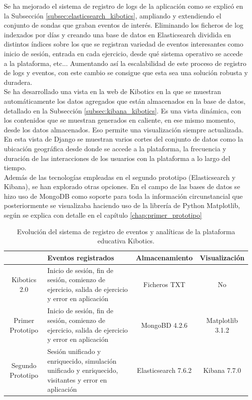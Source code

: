 \documentclass[a4paper, 12pt]{book}
\begin{document}
		Se ha mejorado el sistema de registro de logs de la aplicación como se explicó en la Subsección \ref{subsec:elasticsearch_kibotics}, ampliando y extendiendo el conjunto de sondas que graban eventos de interés. Eliminando los ficheros de log indexados por días y creando una base de datos en Elasticsearch dividida en distintos índices sobre los que se registran variedad de eventos interesantes como inicio de sesión, entrada en cada ejercicio, desde qué sistema operativo se accede a la plataforma, etc... Aumentando así la escalabilidad de este proceso de registro de logs y eventos, con este cambio se consigue que esta sea una solución robusta y duradera.\\
	
		Se ha desarrollado una vista en la web de Kibotics en la que se muestran automáticamente los datos agregados que están almacenados en la base de datos, detallado en la Subsección \ref{subsec:kibana_kibotics}. Es una vista dinámica, con los contenidos que se muestran generados en caliente, en ese mismo momento, desde los datos almacenados. Eso permite una visualización siempre actualizada. En esta vista de Django se muestran varios cortes del conjunto de datos como la ubicación geográfica desde donde se accede a la plataforma, la frecuencia y duración de las interacciones de los usuarios con la plataforma a lo largo del tiempo. \\
	
		Además de las tecnologías empleadas en el segundo prototipo (Elasticsearch y Kibana), se han explorado otras opciones. En el campo de las bases de datos se hizo uso de MongoDB como soporte para toda la información circunstancial que posteriormente se visualizaba haciendo uso de la librería de Python Matplotlib, según se explica con detalle en el capítulo \ref{chap:primer_prototipo} \\

		
		\begin{table}[H]
			\begin{center}
				\begin{tabular}{ | c | p{6cm} | c | c |} 
					\hline
				 & Eventos registrados & Almacenamiento & Visualización \\ 
					\hline 
					Kibotics 2.0 & Inicio de sesión, fin de sesión, comienzo de ejercicio, salida de ejercicio y error en aplicación & Ficheros TXT & No\\ 
					\hline
					Primer Prototipo & Inicio de sesión, fin de sesión, comienzo de ejercicio, salida de ejercicio y error en aplicación& MongoBD 4.2.6 & Matplotlib 3.1.2\\ 
					\hline
					Segundo Prototipo & Sesión unificado y enriquecido, simulación  unificado y enriquecido, visitantes y error en aplicación & Elasticsearch 7.6.2 & Kibana 7.7.0\\ 
					\hline

				\end{tabular}
				\label{tabla:evolucion_analiticas}
				\caption{Evolución del sistema de registro de eventos y analíticas de la plataforma educativa Kibotics.}
			\end{center}
		\end{table}
	
\end{document}
